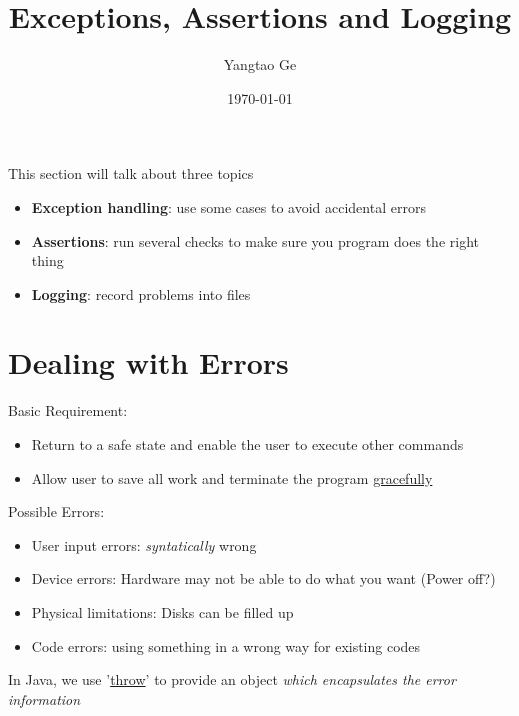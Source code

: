 \documentclass[12pt]{article}
\title{Exceptions, Assertions and Logging}
\author{Yangtao Ge}
\date{\today}
\begin{document}
\maketitle
This section will talk about three topics
\begin{itemize}
    \item \textbf{Exception handling}: use some cases to avoid accidental errors
    \item \textbf{Assertions}: run several checks to make sure you program does the right thing
    \item \textbf{Logging}: record problems into files
\end{itemize}

\section{Dealing with Errors}
Basic Requirement:
\begin{itemize}
    \item Return to a safe state and enable the user to execute other commands
    \item Allow user to save all work and terminate the program \underline{gracefully}
\end{itemize}

Possible Errors:
\begin{itemize}
    \item User input errors: \textit{syntatically} wrong
    \item Device errors: Hardware may not be able to do what you want (Power off?)
    \item Physical limitations: Disks can be filled up 
    \item Code errors: using something in a wrong way for existing codes
\end{itemize}

In Java, we use '\underline{throw}' to provide an object \textit{which encapsulates the error information}
\end{document}
